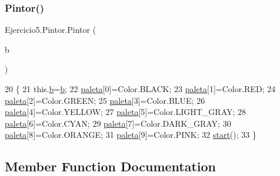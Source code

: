 \subsubsection{\texorpdfstring{Pintor()}{Pintor()}}
{\footnotesize\ttfamily Ejercicio5.\+Pintor.\+Pintor (\begin{DoxyParamCaption}\item[{J\+Button}]{b }\end{DoxyParamCaption})\hspace{0.3cm}{\ttfamily [inline]}}


\begin{DoxyCode}
20                             \{
21         this.\mbox{\hyperlink{class_ejercicio5_1_1_pintor_a470004bc84afaefaee715182d6601df2}{b}}=\mbox{\hyperlink{class_ejercicio5_1_1_pintor_a470004bc84afaefaee715182d6601df2}{b}};
22         \mbox{\hyperlink{class_ejercicio5_1_1_pintor_a8604057520bcd80da76eb95ac70367a9}{paleta}}[0]=Color.BLACK;
23         \mbox{\hyperlink{class_ejercicio5_1_1_pintor_a8604057520bcd80da76eb95ac70367a9}{paleta}}[1]=Color.RED;
24         \mbox{\hyperlink{class_ejercicio5_1_1_pintor_a8604057520bcd80da76eb95ac70367a9}{paleta}}[2]=Color.GREEN;
25         \mbox{\hyperlink{class_ejercicio5_1_1_pintor_a8604057520bcd80da76eb95ac70367a9}{paleta}}[3]=Color.BLUE;
26         \mbox{\hyperlink{class_ejercicio5_1_1_pintor_a8604057520bcd80da76eb95ac70367a9}{paleta}}[4]=Color.YELLOW;
27         \mbox{\hyperlink{class_ejercicio5_1_1_pintor_a8604057520bcd80da76eb95ac70367a9}{paleta}}[5]=Color.LIGHT\_GRAY;
28         \mbox{\hyperlink{class_ejercicio5_1_1_pintor_a8604057520bcd80da76eb95ac70367a9}{paleta}}[6]=Color.CYAN;
29         \mbox{\hyperlink{class_ejercicio5_1_1_pintor_a8604057520bcd80da76eb95ac70367a9}{paleta}}[7]=Color.DARK\_GRAY;
30         \mbox{\hyperlink{class_ejercicio5_1_1_pintor_a8604057520bcd80da76eb95ac70367a9}{paleta}}[8]=Color.ORANGE;
31         \mbox{\hyperlink{class_ejercicio5_1_1_pintor_a8604057520bcd80da76eb95ac70367a9}{paleta}}[9]=Color.PINK;
32         \mbox{\hyperlink{namespaceejemplo_1_1clase_abcf43191f0ecf3b071ca2db7696ba821}{start}}();
33     \}
\end{DoxyCode}


\subsection{Member Function Documentation}
\mbox{\label{class_ejercicio5_1_1_pintor_a31cafae186af58bb92c56a642d0997cb}} 
